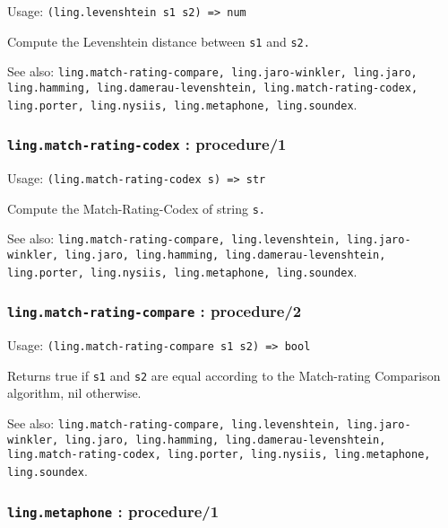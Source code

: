 \documentclass[
]{article}
\newcommand{\passthrough}[1]{#1}
\begin{document}
Usage: \passthrough{\lstinline!(ling.levenshtein s1 s2) => num!}

Compute the Levenshtein distance between \passthrough{\lstinline!s1!}
and \passthrough{\lstinline!s2.!}

See also:
\passthrough{\lstinline!ling.match-rating-compare, ling.jaro-winkler, ling.jaro, ling.hamming, ling.damerau-levenshtein, ling.match-rating-codex, ling.porter, ling.nysiis, ling.metaphone, ling.soundex!}.

\hypertarget{ling.match-rating-codex-procedure1}{%
\subsubsection{\texorpdfstring{\texttt{ling.match-rating-codex} :
procedure/1}{ling.match-rating-codex : procedure/1}}\label{ling.match-rating-codex-procedure1}}

Usage: \passthrough{\lstinline!(ling.match-rating-codex s) => str!}

Compute the Match-Rating-Codex of string \passthrough{\lstinline!s.!}

See also:
\passthrough{\lstinline!ling.match-rating-compare, ling.levenshtein, ling.jaro-winkler, ling.jaro, ling.hamming, ling.damerau-levenshtein, ling.porter, ling.nysiis, ling.metaphone, ling.soundex!}.

\hypertarget{ling.match-rating-compare-procedure2}{%
\subsubsection{\texorpdfstring{\texttt{ling.match-rating-compare} :
procedure/2}{ling.match-rating-compare : procedure/2}}\label{ling.match-rating-compare-procedure2}}

Usage:
\passthrough{\lstinline!(ling.match-rating-compare s1 s2) => bool!}

Returns true if \passthrough{\lstinline!s1!} and
\passthrough{\lstinline!s2!} are equal according to the Match-rating
Comparison algorithm, nil otherwise.

See also:
\passthrough{\lstinline!ling.match-rating-compare, ling.levenshtein, ling.jaro-winkler, ling.jaro, ling.hamming, ling.damerau-levenshtein, ling.match-rating-codex, ling.porter, ling.nysiis, ling.metaphone, ling.soundex!}.

\hypertarget{ling.metaphone-procedure1}{%
\subsubsection{\texorpdfstring{\texttt{ling.metaphone} :
procedure/1}{ling.metaphone : procedure/1}}\label{ling.metaphone-procedure1}}
\end{document}
